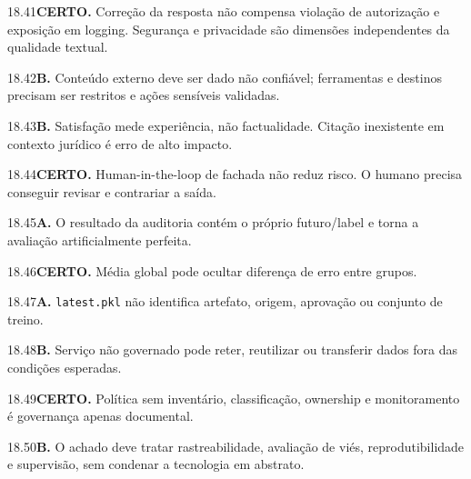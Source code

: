 \begin{solucao}{18.41}\textbf{CERTO.} Correção da resposta não compensa violação de autorização e exposição em logging. Segurança e privacidade são dimensões independentes da qualidade textual.\end{solucao}
\begin{solucao}{18.42}\textbf{B.} Conteúdo externo deve ser dado não confiável; ferramentas e destinos precisam ser restritos e ações sensíveis validadas.\end{solucao}
\begin{solucao}{18.43}\textbf{B.} Satisfação mede experiência, não factualidade. Citação inexistente em contexto jurídico é erro de alto impacto.\end{solucao}
\begin{solucao}{18.44}\textbf{CERTO.} Human-in-the-loop de fachada não reduz risco. O humano precisa conseguir revisar e contrariar a saída.\end{solucao}
\begin{solucao}{18.45}\textbf{A.} O resultado da auditoria contém o próprio futuro/label e torna a avaliação artificialmente perfeita.\end{solucao}
\begin{solucao}{18.46}\textbf{CERTO.} Média global pode ocultar diferença de erro entre grupos.\end{solucao}
\begin{solucao}{18.47}\textbf{A.} \texttt{latest.pkl} não identifica artefato, origem, aprovação ou conjunto de treino.\end{solucao}
\begin{solucao}{18.48}\textbf{B.} Serviço não governado pode reter, reutilizar ou transferir dados fora das condições esperadas.\end{solucao}
\begin{solucao}{18.49}\textbf{CERTO.} Política sem inventário, classificação, ownership e monitoramento é governança apenas documental.\end{solucao}
\begin{solucao}{18.50}\textbf{B.} O achado deve tratar rastreabilidade, avaliação de viés, reprodutibilidade e supervisão, sem condenar a tecnologia em abstrato.\end{solucao}
